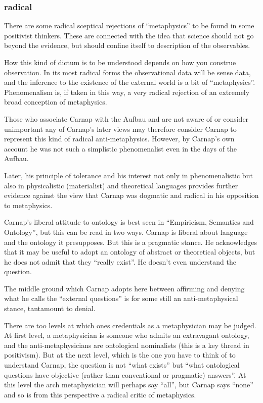 \documentclass[10pt,titlepage]{book}
\begin{document}
\subsubsection{radical}
There are some radical sceptical rejections of ``metaphysics'' to be found in some positivist thinkers.
These are connected with the idea that science should not go beyond the evidence, but should confine itself to description of the observables.

How this kind of dictum is to be understood depends on how you construe observation.
In its most radical forms the observational data will be sense data, and the inference to the existence of the external world is a bit of ``metaphysics''.
Phenomenalism is, if taken in this way, a very radical rejection of an extremely broad conception of metaphysics.

Those who associate Carnap with the Aufbau and are not aware of or consider unimportant any of Carnap's later views may therefore consider Carnap to represent this kind of radical anti-metaphysics.
However, by Carnap's own account he was not such a simplistic phenomenalist even in the days of the Aufbau.

Later, his principle of tolerance and his interest not only in phenomenalistic but also in physicalistic (materialist) and theoretical languages provides further evidence against the view that Carnap was dogmatic and radical in his opposition to metaphysics.

Carnap's liberal attitude to ontology is best seen in ``Empiricism, Semantics and Ontology''\cite{carnap50,carnap56}, but this can be read in two ways.
Carnap is liberal about language and the ontology it presupposes.
But this is a pragmatic stance.
He acknowledges that it may be useful to adopt an ontology of abstract or theoretical objects, but he does not admit that they ``really exist''.
He doesn't even understand the question.

The middle ground which Carnap adopts here between affirming and denying what he calls the ``external questions'' is for some still an anti-metaphysical stance, tantamount to denial.

There are too levels at which ones credentials as a metaphysician may be judged.
At first level, a metaphysician is someone who admits an extravagant ontology, and the anti-metaphysicians are ontological nominalists (this is a key thread in positivism).
But at the next level, which is the one you have to think of to understand Carnap, the question is not ``what exists'' but ``what ontological questions have objective (rather than conventional or pragmatic) answers''.
At this level the arch metaphysician will perhaps say ``all'', but Carnap says ``none'' and so is from this perspective a radical critic of metaphysics.
\end{document}
